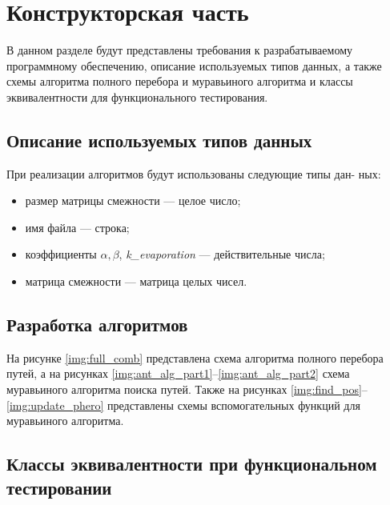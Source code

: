 \chapter{Конструкторская часть}
В данном разделе будут представлены требования к разрабатываемому программному обеспечению, описание используемых типов данных, а также схемы алгоритма полного перебора и муравьиного алгоритма и классы эквивалентности для функционального тестирования.

\section{Описание используемых типов данных}
При реализации алгоритмов будут использованы следующие типы дан-
ных:
\begin{itemize}[label=---]
	\item размер матрицы смежности --- целое число;
	\item имя файла --- строка;
	\item коэффициенты $\alpha, \beta$, \textit{k\_evaporation} --- действительные числа;
	\item матрица смежности --- матрица целых чисел.
\end{itemize}

\section{Разработка алгоритмов}
На рисунке \ref{img:full_comb} представлена схема алгоритма полного перебора путей, а на рисунках \ref{img:ant_alg_part1}--\ref{img:ant_alg_part2} схема муравьиного алгоритма поиска путей. Также на рисунках \ref{img:find_pos}--\ref{img:update_phero} представлены схемы вспомогательных функций для муравьиного алгоритма.


\clearpage

\section{Классы эквивалентности при функциональном тестировании}

